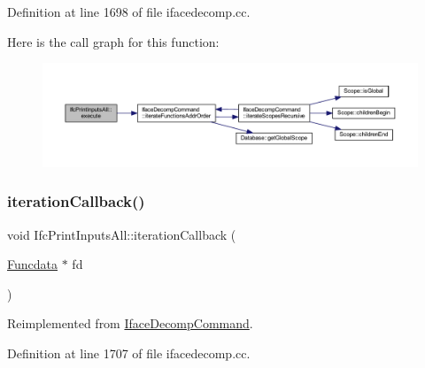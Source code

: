 Definition at line 1698 of file ifacedecomp.\+cc.

Here is the call graph for this function\+:
\nopagebreak
\begin{figure}[H]
\begin{center}
\leavevmode
\includegraphics[width=350pt]{class_ifc_print_inputs_all_aaf763e010c0f82c94d95d9443fbe6f2c_cgraph}
\end{center}
\end{figure}
\mbox{\label{class_ifc_print_inputs_all_af1ed619938898b1dd91be98c256a7512}} 
\subsubsection{\texorpdfstring{iterationCallback()}{iterationCallback()}}
{\footnotesize\ttfamily void Ifc\+Print\+Inputs\+All\+::iteration\+Callback (\begin{DoxyParamCaption}\item[{\mbox{\hyperlink{class_funcdata}{Funcdata}} $\ast$}]{fd }\end{DoxyParamCaption})\hspace{0.3cm}{\ttfamily [virtual]}}



Reimplemented from \mbox{\hyperlink{class_iface_decomp_command_a619d9358a4e77bef66a26f02ea7a6c8e}{Iface\+Decomp\+Command}}.



Definition at line 1707 of file ifacedecomp.\+cc.

